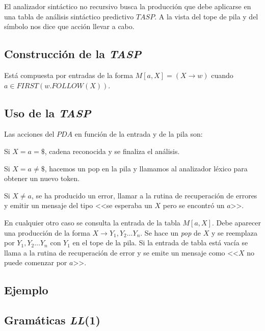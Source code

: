 El analizador sintáctico no recursivo  busca la producción que debe aplicarse en una tabla de análisis sintáctico predictivo $TASP$. A la vista del tope de pila y del símbolo nos dice que acción llevar a cabo.
              
\subsection{Construcción de la \textit{TASP}}

Está compuesta por entradas de la forma $M[a,X]=(X\rightarrow w)$        cuando 
          $a\in FIRST(w.FOLLOW(X))$.

 
\subsection{Uso de la \textit{TASP}}

Las acciones del $PDA$ en función de la entrada y de
la pila son:

  Si $X=a=\$$, cadena reconocida y se finaliza el análisis.
  
  Si $X=a\neq \$$, hacemos un pop en la pila y llamamos al analizador léxico para obtener un nuevo token.
  
  Si $X\neq a$, se ha producido un error, llamar a la rutina de recuperación de errores y emitir un mensaje del tipo <<se esperaba un $X$ pero se encontró un $ a $>>.
  
  En cualquier otro caso se consulta la entrada de la tabla $M[a,X]$. Debe aparecer una producción de la forma $ X\rightarrow Y_{1},Y_{2}\ldots  Y_{n}$. Se hace un \textit{pop} de $ X$ y se reemplaza por $Y_{1},Y_{2}\ldots Y_{n}$ con $Y_{1}$ en el tope de la pila.
Si la entrada de tabla está vacía se llama a la rutina de recuperación de error y se emite un mensaje como <<$X$ no puede comenzar por $a$>>.

\subsection{Ejemplo}





\subsection{Gramáticas \textit{LL}(1)}

